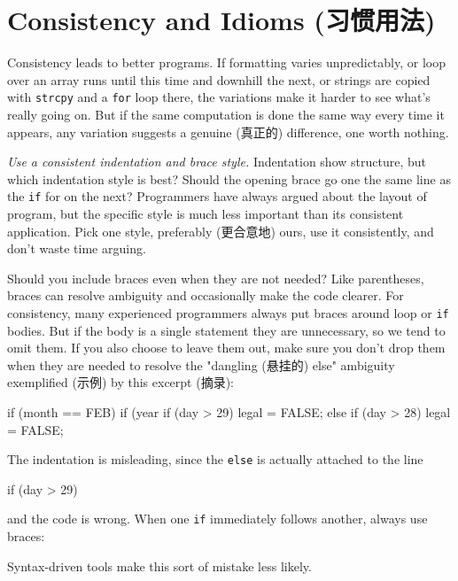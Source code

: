 \section{Consistency and Idioms (习惯用法)}
\label{sec:consist_idom}
Consistency leads to better programs. If formatting varies unpredictably, or
loop over an array runs until this time and downhill the next, or strings
are copied with \verb'strcpy' and a \verb'for' loop there, the variations
make it harder to see what's really going on. But if the same computation
is done the same way every time it appears, any variation suggests a
genuine (真正的) difference, one worth nothing.

\emph{Use a consistent indentation and brace style.} Indentation show
structure, but which indentation style is best? Should the opening brace go
one the same line as the \verb'if' for on the next? Programmers have always
argued about the layout of program, but the specific style is much less
important than its consistent application. Pick one style,
preferably (更合意地) ours, use it consistently, and don't waste time
arguing.

Should you include braces even when they are not needed? Like parentheses,
braces can resolve ambiguity and occasionally make the code clearer. For
consistency, many experienced programmers always put braces around loop
or \verb'if' bodies. But if the body is a single statement they are
unnecessary, so we tend to omit them. If you also choose to leave them out,
make sure you don't drop them when they are needed to resolve the
"dangling (悬挂的) else" ambiguity exemplified (示例) by this excerpt (摘录):
\begin{badcode}
    if (month == FEB) {
        if (year%
            if (day > 29)
                legal = FALSE;
        else 
            if (day > 28)
                legal = FALSE;
    }
\end{badcode}
The indentation is misleading, since the \verb'else' is actually attached
to the line 
\begin{badcode}
    if (day > 29)
\end{badcode}
and the code is wrong. When one \verb'if' immediately follows another,
always use braces:
Syntax-driven tools make this sort of mistake less likely.

